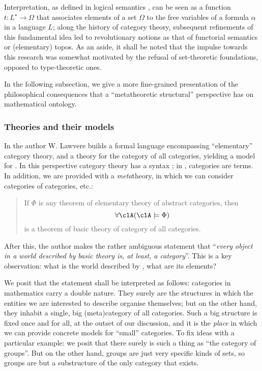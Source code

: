 Interpretation, as defined in logical semantics \cite{gamut1991logic}, can be seen as a function $t : L^\star \to \Omega$ that associates elements of a set $\Omega$ to the free variables of a formula $\alpha$ in a language $L$; along the history of category theory, subsequent refinements of this fundamental idea led to revolutionary notions as that of functorial semantics or (elementary) topos.
As an aside, it shall be noted that the impulse towards this research was somewhat motivated by the refusal of set-theoretic foundations, opposed to type-theoretic ones.

In the following subsection, we give a more fine-grained presentation of the philosophical consequences that a ``metatheoretic structural'' perspective has on mathematical ontology.
\subsubsection{Theories and their models}
In \cite{lajolla} the author W. Lawvere builds a formal language  encompassing ``elementary'' category theory, and a theory  for the category of all categories, yielding a model for . In this perspective category theory has a syntax \CT; in \CT, categories are terms. In addition, we are provided with a \emph{meta}theory, in which we can consider categories of categories, etc.:%
\begin{quote}
	If $\Phi$ is any theorem of elementary theory of abstract categories, then
  \[\forall \clA (\clA \models \Phi)\]
  is a theorem of basic theory of category of all categories. \hfill \cite{lajolla}
\end{quote}
After this, the author makes the rather ambiguous statement that ``\textit{every object in a world described by basic theory is, at least, a category}''. This is a key observation: what is the world described by , what are its elements?

We posit that the statement shall be interpreted as follows: categories in mathematics carry a double nature. They surely are the structures in which the entities we are interested to describe organise themselves; but on the other hand, they inhabit a single, big (meta)category of all categories. Such a big structure is fixed once and for all, at the outset of our discussion, and it is the \emph{place} in which we can provide concrete models for ``small'' categories. To fix ideas with a particular example: we posit that there surely is such a thing as ``the category of groups''. But on the other hand, groups are just very specific kinds of sets, so groups are but a substructure of the only category that exists.%

